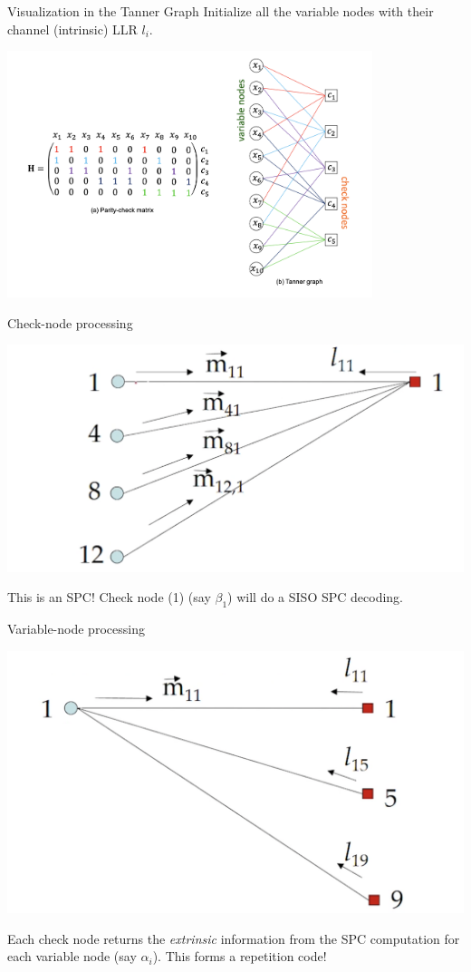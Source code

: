 \documentclass[aspectratio=1610, 10pt]{beamer}
\begin{document}
\begin{frame}[label={sec:orgebd0ed8}]{Visualization in the Tanner Graph}
Initialize all the variable nodes with their channel (intrinsic) LLR \(l_i\).
\begin{center}
\includegraphics[width=0.8\textwidth]{./tanner.png}
\end{center}
\end{frame}

\begin{frame}[label={sec:orgb8b568b}]{Check-node processing}
\begin{center}
\includegraphics[width=.9\linewidth]{./first_iter.png}
\end{center}

This is an SPC! Check node (1) (say \(\beta_1\)) will do a SISO SPC decoding.
\end{frame}

\begin{frame}[label={sec:orga67fef6}]{Variable-node processing}
\begin{center}
\includegraphics[width=.9\linewidth]{./next_iter.png}
\end{center}
Each check node returns the \emph{extrinsic} information from the
SPC computation for each variable node (say \(\alpha_i\)). This forms a
repetition code!
\end{frame}
\end{document}
